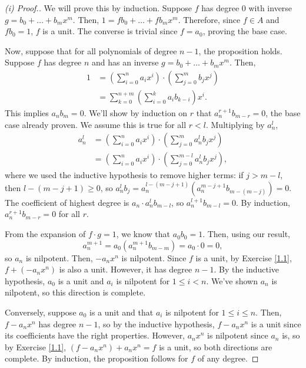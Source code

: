 \begin{proof}[(i) Proof.]
We will prove this by induction. Suppose $f$ has degree $0$ with inverse $g = b_0 + \dots + b_m x^m$. Then,
$1 = fb_0 + \dots + fb_m x^m$. Therefore, since $f \in A$ and $fb_0 = 1$, $f$ is a unit. The converse is trivial since $f=a_0$,
proving the base case.

Now, suppose that for all polynomials of degree $n-1$, the proposition holds. Suppose $f$ has degree $n$ and 
has an inverse $g = b_0 + \dots + b_mx^m$. Then,
\begin{align*}
1 &= \left(\sum_{i=0}^n a_i x^i\right) \cdot \left(\sum_{j=0}^m b_j x^j\right) \\
&= \sum_{k=0}^{n+m}\left(\sum_{i=0}^k a_i b_{k-i}\right)x^i.
\end{align*}
This implies $a_n b_m = 0$. We'll show by induction on $r$ that $a_n^{r+1} b_{m-r} = 0$, the base case already
proven. We assume this is true for all $r < l$. Multiplying by $a_n^l$,
\begin{align*}
a_n^l &= \left(\sum_{i=0}^n a_i x^i\right) \cdot \left(\sum_{j=0}^m a_n^l b_j x^j\right) \\
&= \left(\sum_{i=0}^n a_i x^i\right) \cdot \left(\sum_{j=0}^{m-l} a_n^l b_j x^j\right),
\end{align*}
where we used the inductive hypothesis to remove higher terms: if $j > m-l$, then $l-(m-j+1) \ge 0$, so $a_n^l b_j = a_n^{l-(m-j+1)}(a_n^{m-j+1}b_{m-(m-j)}) = 0$.
The coefficient of highest degree is $a_n \cdot a_n^l b_{m-l}$, so $a_n^{l+1}b_{m-l}=0$. By induction, $a_n^{r+1}b_{m-r}=0$
for all $r$.

From the expansion of $f \cdot g = 1$, we know that $a_0 b_0 = 1$. Then, using our result,
$$a_n^{m+1} = a_0 (a_n^{m+1}b_{m - m}) = a_0 \cdot 0 = 0,$$
so $a_n$ is nilpotent. Then, $- a_n x^n$ is nilpotent. Since $f$ is a unit, by Exercise \ref{1.1},
$f + (-a_n x^n)$ is also a unit. However, it has degree $n-1$. By the inductive hypothesis, $a_0$ is a unit and $a_i$ is nilpotent
for $1 \le i < n$. We've shown $a_n$ is nilpotent, so this direction is complete.

Conversely, suppose $a_0$ is a unit and that $a_i$ is nilpotent for $1 \le i \le n$. Then, $f - a_nx^n$ has degree $n-1$,
so by the inductive hypothesis, $f - a_nx^n$ is a unit since its coefficients have the right properties. 
However, $a_n x^n$ is nilpotent since $a_n$ is, so by Exercise \ref{1.1},
$(f - a_nx^n) + a_n x^n = f$ is a unit, so both directions are complete. By induction, the proposition follows for $f$ of any degree.
\end{proof}

